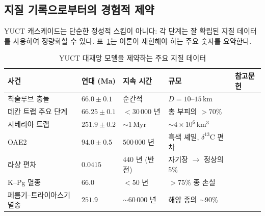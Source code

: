 \documentclass[12pt,a4paper]{article}
\begin{document}
	\subsection{지질 기록으로부터의 경험적 제약}
	YUCT 캐스케이드는 단순한 정성적 스킴이 아니다: 각 단계는 잘 확립된 지질 데이터를 사용하여 정량화할 수 있다. 표~\ref{tab:geodata}는 이론이 재현해야 하는 주요 숫자를 요약한다.
	
	\begin{table}[H]
		\centering
		\small
		\caption{YUCT 대재앙 모델을 제약하는 주요 지질 데이터}
		\label{tab:geodata}
		\begin{tabular}{@{}p{4.2cm} p{2.6cm} p{2.8cm} p{4.2cm} p{1.2cm}@{}}
			\toprule
			\textbf{사건} & \textbf{연대 (Ma)} & \textbf{지속 시간} & \textbf{규모} & \textbf{참고문헌} \\
			\midrule
			칙술루브 충돌 & \(66.0 \pm 0.1\) & 순간적 & \(D = 10\)–\(15\) km & \cite{Schulte2010} \\
			데칸 트랩 주요 단계 & \(66.25 \pm 0.1\) & \(<30\,000\) 년 & 총 부피의 \(>70\%\) & \cite{Schoene2019} \\
			시베리아 트랩 & \(251.9 \pm 0.2\) & \(\sim 1\) Myr & \(\sim 4\times10^6\) km\(^3\) & \cite{SiberianTraps} \\
			OAE2 & \(94.0 \pm 0.5\) & \(500\,000\) 년 & 흑색 셰일, \(\delta^{13}\)C 편차 & \cite{Jenkyns2010} \\
			라샹 편차 & \(0.0415\) & \(440\) 년 (반전) & 자기장 \(\to\) 정상의 5\% & \cite{Laschamp} \\
			K–Pg 멸종 & \(66.0\) & \(<50\) 년 & \(>75\%\) 종 손실 & \cite{Schulte2010} \\
			페름기–트라이아스기 멸종 & \(251.9\) & \(\sim 60\,000\) 년 & 해양 종의 \(\sim 90\%\) & \cite{Burgess2014} \\
			\bottomrule
		\end{tabular}
	\end{table}
	
\end{document}
